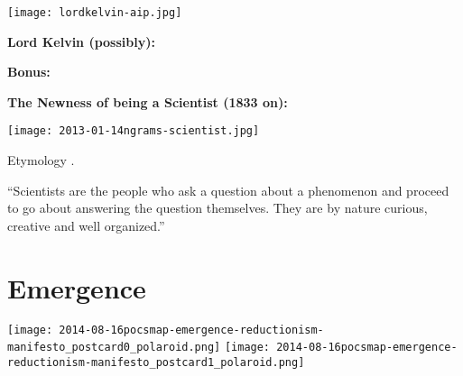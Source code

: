     \texttt{[image: lordkelvin-aip.jpg]}
    
    \textbf{Lord Kelvin (possibly):}
       
    \textbf{Bonus:}
        {
        }
      
        {
        }
  
  \textbf{The Newness of being a Scientist (1833 on):}

  \texttt{[image: 2013-01-14ngrams-scientist.jpg]}
    
     
      Etymology 
      .
     
      ``Scientists are the people who ask a question about a phenomenon and proceed to  go about answering the question themselves. They are by nature curious, creative and well organized.''
  



\section{Emergence}
  \texttt{[image: 2014-08-16pocsmap-emergence-reductionism-manifesto\_postcard0\_polaroid.png]}
  \texttt{[image: 2014-08-16pocsmap-emergence-reductionism-manifesto\_postcard1\_polaroid.png]}
  
